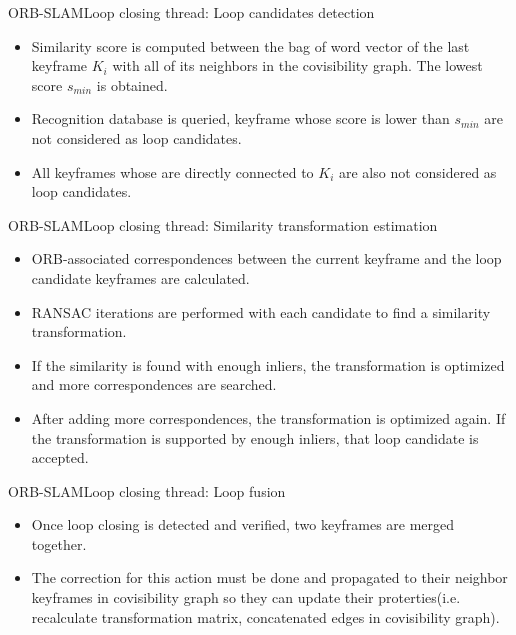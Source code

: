 \documentclass[aspectratio=169]{beamer}
\begin{document}
\begin{frame}{ORB-SLAM}{Loop closing thread: Loop candidates detection}
  \begin{itemize}
      \item{
      Similarity score is computed between the bag of word vector of the last keyframe $K_{i}$ with all of its neighbors in the covisibility graph. The lowest score $s_{min}$ is obtained.
      }
      \item{
      Recognition database is queried, keyframe whose score is lower than $s_{min}$ are not considered as loop candidates.
      }
      \item{
      All keyframes whose are directly connected to $K_{i}$ are also not considered as loop candidates.
      }
  \end{itemize}
\end{frame}

\begin{frame}{ORB-SLAM}{Loop closing thread: Similarity transformation estimation}
  \begin{itemize}
      \item{
      ORB-associated correspondences between the current keyframe and the loop candidate keyframes are calculated.
      }
      \item{
      RANSAC iterations are performed with each candidate to find a similarity transformation. 
      }
      \item{
      If the similarity is found with enough inliers, the transformation is optimized and more correspondences are searched.
      }
      \item{
      After adding more correspondences, the transformation is optimized again. If the transformation is supported by enough inliers, that loop candidate is accepted.
      }
  \end{itemize}
\end{frame}

\begin{frame}{ORB-SLAM}{Loop closing thread: Loop fusion}
  \begin{itemize}
      \item{
      Once loop closing is detected and verified, two keyframes are merged together.
      }
      \item{
      The correction for this action must be done and propagated to their neighbor keyframes in covisibility graph so they can update their proterties(i.e. recalculate transformation matrix, concatenated edges in covisibility graph). 

      }
  \end{itemize}
\end{frame}
\end{document}
